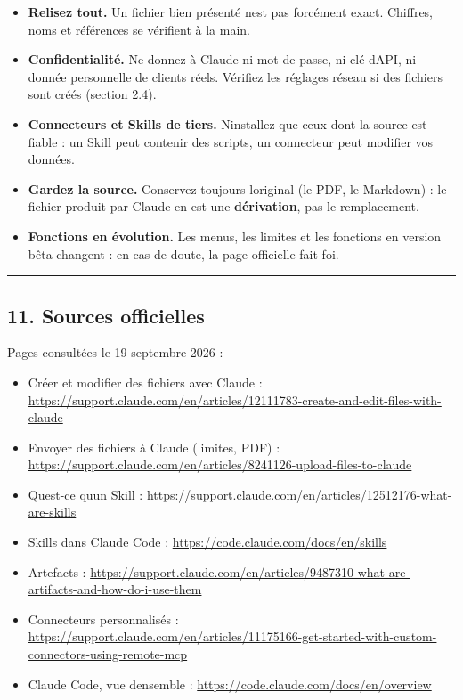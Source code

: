 \documentclass[
  french,
  11pt,
  a4paper,
]{article}
\providecommand{\tightlist}{%
  \setlength{\itemsep}{0pt}\setlength{\parskip}{0pt}}
\begin{document}
\begin{itemize}
\tightlist
\item
  \textbf{Relisez tout.} Un fichier bien présenté n\textquotesingle est
  pas forcément exact. Chiffres, noms et références se vérifient à la
  main.
\item
  \textbf{Confidentialité.} Ne donnez à Claude ni mot de passe, ni clé
  d\textquotesingle API, ni donnée personnelle de clients réels.
  Vérifiez les réglages réseau si des fichiers sont créés (section 2.4).
\item
  \textbf{Connecteurs et Skills de tiers.} N\textquotesingle installez
  que ceux dont la source est fiable : un Skill peut contenir des
  scripts, un connecteur peut modifier vos données.
\item
  \textbf{Gardez la source.} Conservez toujours
  l\textquotesingle original (le PDF, le Markdown) : le fichier produit
  par Claude en est une \textbf{dérivation}, pas le remplacement.
\item
  \textbf{Fonctions en évolution.} Les menus, les limites et les
  fonctions en version bêta changent : en cas de doute, la page
  officielle fait foi.
\end{itemize}

\begin{center}\rule{0.5\linewidth}{0.5pt}\end{center}

\subsection{11. Sources officielles}\label{11-sources-officielles}

Pages consultées le 19 septembre 2026 :

\begin{itemize}
\tightlist
\item
  Créer et modifier des fichiers avec Claude :
  \url{https://support.claude.com/en/articles/12111783-create-and-edit-files-with-claude}
\item
  Envoyer des fichiers à Claude (limites, PDF) :
  \url{https://support.claude.com/en/articles/8241126-upload-files-to-claude}
\item
  Qu\textquotesingle est-ce qu\textquotesingle un Skill :
  \url{https://support.claude.com/en/articles/12512176-what-are-skills}
\item
  Skills dans Claude Code : \url{https://code.claude.com/docs/en/skills}
\item
  Artefacts :
  \url{https://support.claude.com/en/articles/9487310-what-are-artifacts-and-how-do-i-use-them}
\item
  Connecteurs personnalisés :
  \url{https://support.claude.com/en/articles/11175166-get-started-with-custom-connectors-using-remote-mcp}
\item
  Claude Code, vue d\textquotesingle ensemble :
  \url{https://code.claude.com/docs/en/overview}
\end{itemize}
\end{document}
